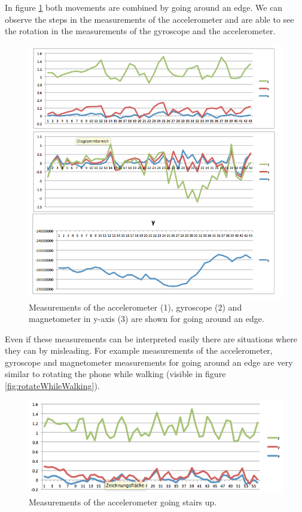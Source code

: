 In figure \ref{fig:edge} both movements are combined by going around an edge. We can observe the steps in the measurements of the accelerometer and are able to see the rotation in the measurements of the gyroscope and the accelerometer. 

\begin{figure}[h]
	\centering
		\includegraphics[width=.6\textwidth]{images/experiments/edge.png}
	\caption{Measurements of the accelerometer (1), gyroscope (2) and magnetometer in y-axis (3) are shown for going around an edge.}
	\label{fig:edge}
\end{figure}

Even if these measurements can be interpreted easily there are situations where they can by misleading. For example measurements of the accelerometer, gyroscope and magnetometer measurements for going around an edge are very similar to rotating the phone while walking (visible in figure \ref{fig:rotateWhileWalking}).

\begin{figure}[h]
	\centering
		\includegraphics[width=.6\textwidth]{images/experiments/stairs.png}
	\caption{Measurements of the accelerometer going stairs up.}
	\label{fig:stairs}
\end{figure}


